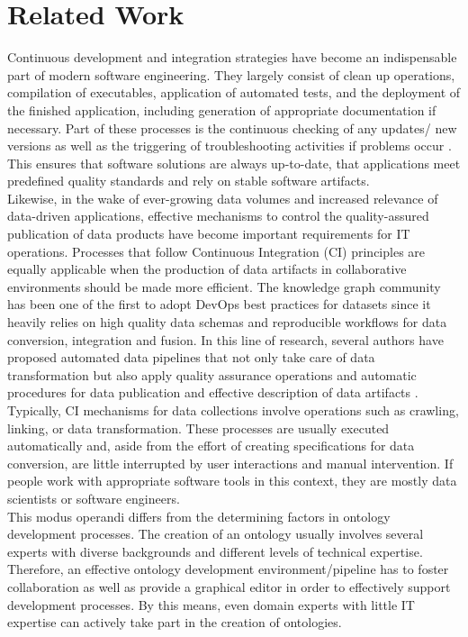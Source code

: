 \documentclass[sigconf]{acmart}
\begin{document}
\section{Related Work}
Continuous development and integration strategies have become an indispensable part of modern software engineering.
They largely consist of clean up operations, compilation of executables, application of automated tests, and the deployment of the finished application, including generation of appropriate documentation if necessary. Part of these processes is the continuous checking of any updates/ new versions as well as the triggering of troubleshooting activities if problems occur \cite{fowler}.
This ensures that software solutions are always up-to-date, that applications meet predefined quality standards and rely on stable software artifacts.\\
Likewise, in the wake of ever-growing data volumes and increased relevance of data-driven applications, effective mechanisms to control the quality-assured publication of data products have become important requirements for IT operations. Processes that follow Continuous Integration (CI) principles are equally applicable when the production of data artifacts in collaborative environments should be made more efficient. The knowledge graph community has been one of the first to adopt DevOps best practices for datasets since it heavily relies on high quality data schemas and reproducible workflows for data conversion, integration and fusion. In this line of research, several authors have proposed automated data pipelines that not only take care of data transformation but also apply quality assurance operations and automatic procedures for data publication and effective description of data artifacts
\cite{cirulli, klimek, kucera, meissner, rojas, roman, stadler, dataid}. Typically, CI mechanisms for data collections involve operations such as crawling, linking, or data transformation. These processes are usually executed automatically and, aside from the effort of creating specifications for data conversion, are little interrupted by user interactions and manual intervention. If people work with appropriate software tools in this context, they are mostly data scientists or software engineers.\\
This modus operandi differs from the determining factors in ontology development processes. The creation of an ontology usually involves several experts with diverse backgrounds and different levels of technical expertise. Therefore, an effective ontology development environment/pipeline has to foster collaboration as well as provide a graphical editor in order to effectively support development processes. By this means, even domain experts with little IT expertise can actively take part in the creation of ontologies.\\
\end{document}
